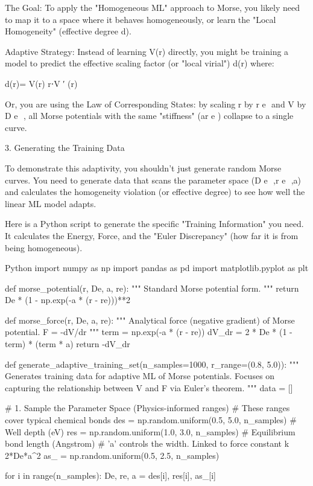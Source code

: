 The Goal: To apply the "Homogeneous ML" approach to Morse, you likely need to map it to a space where it behaves homogeneously, or learn the "Local Homogeneity" (effective degree d).

Adaptive Strategy: Instead of learning V(r) directly, you might be training a model to predict the effective scaling factor (or "local virial") d(r) where:

d(r)= 
V(r)
r⋅V 
′
 (r)
​	
 
Or, you are using the Law of Corresponding States: by scaling r by r 
e
​	
  and V by D 
e
​	
 , all Morse potentials with the same "stiffness" (ar 
e
​	
 ) collapse to a single curve.

3. Generating the Training Data

To demonstrate this adaptivity, you shouldn't just generate random Morse curves. You need to generate data that scans the parameter space (D 
e
​	
 ,r 
e
​	
 ,a) and calculates the homogeneity violation (or effective degree) to see how well the linear ML model adapts.

Here is a Python script to generate the specific "Training Information" you need. It calculates the Energy, Force, and the "Euler Discrepancy" (how far it is from being homogeneous).

Python
import numpy as np
import pandas as pd
import matplotlib.pyplot as plt

def morse_potential(r, De, a, re):
    """
    Standard Morse potential form.
    """
    return De * (1 - np.exp(-a * (r - re)))**2

def morse_force(r, De, a, re):
    """
    Analytical force (negative gradient) of Morse potential.
    F = -dV/dr
    """
    term = np.exp(-a * (r - re))
    dV_dr = 2 * De * (1 - term) * (term * a)
    return -dV_dr

def generate_adaptive_training_set(n_samples=1000, r_range=(0.8, 5.0)):
    """
    Generates training data for adaptive ML of Morse potentials.
    Focuses on capturing the relationship between V and F via Euler's theorem.
    """
    data = []

    # 1. Sample the Parameter Space (Physics-informed ranges)
    # These ranges cover typical chemical bonds
    des = np.random.uniform(0.5, 5.0, n_samples)   # Well depth (eV)
    res = np.random.uniform(1.0, 3.0, n_samples)   # Equilibrium bond length (Angstrom)
    # 'a' controls the width. Linked to force constant k ~ 2*De*a^2
    as_ = np.random.uniform(0.5, 2.5, n_samples)   

    for i in range(n_samples):
        De, re, a = des[i], res[i], as_[i]
        
